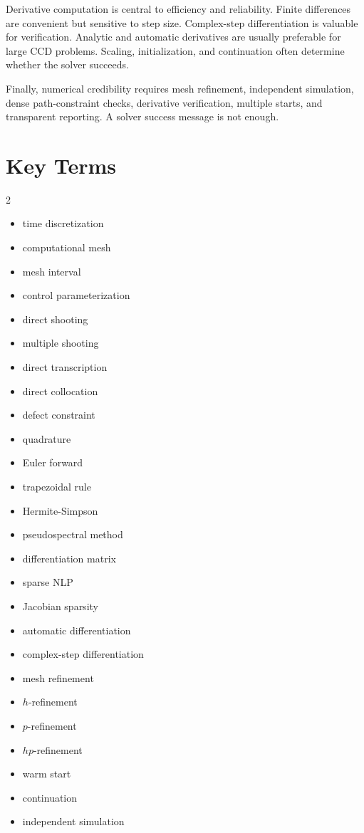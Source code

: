 \documentclass[11pt]{article}
\begin{document}
Derivative computation is central to efficiency and reliability. Finite differences are convenient but sensitive to step size. Complex-step differentiation is valuable for verification. Analytic and automatic derivatives are usually preferable for large CCD problems. Scaling, initialization, and continuation often determine whether the solver succeeds.

Finally, numerical credibility requires mesh refinement, independent simulation, dense path-constraint checks, derivative verification, multiple starts, and transparent reporting. A solver success message is not enough.

\section{Key Terms}

\begin{multicols}{2}
\begin{itemize}[leftmargin=1.4em,itemsep=0.25em]
  \item time discretization
  \item computational mesh
  \item mesh interval
  \item control parameterization
  \item direct shooting
  \item multiple shooting
  \item direct transcription
  \item direct collocation
  \item defect constraint
  \item quadrature
  \item Euler forward
  \item trapezoidal rule
  \item Hermite-Simpson
  \item pseudospectral method
  \item differentiation matrix
  \item sparse NLP
  \item Jacobian sparsity
  \item automatic differentiation
  \item complex-step differentiation
  \item mesh refinement
  \item $h$-refinement
  \item $p$-refinement
  \item $hp$-refinement
  \item warm start
  \item continuation
  \item independent simulation
\end{itemize}
\end{multicols}
\end{document}
